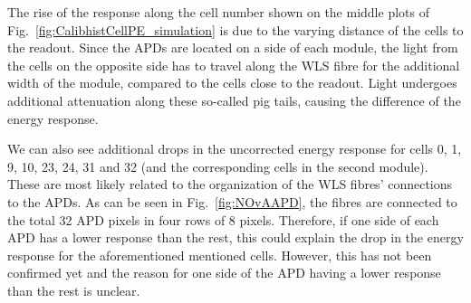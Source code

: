 The rise of the response along the cell number shown on the middle plots of Fig.~\ref{fig:CalibhistCellPE_simulation} is due to the varying distance of the cells to the readout. Since the \gls{APD}s are located on a side of each module, the light from the cells on the opposite side has to travel along the \gls{WLS} fibre for the additional width of the module, compared to the cells close to the readout. Light undergoes additional attenuation along these so-called pig tails, causing the difference of the energy response.

We can also see additional drops in the uncorrected energy response for cells 0, 1, 9, 10, 23, 24, 31 and 32 (and the corresponding cells in the second module). These are most likely related to the organization of the \gls{WLS} fibres' connections to the \gls{APD}s. As can be seen in Fig.~\ref{fig:NOvAAPD}, the fibres are connected to the total 32 \gls{APD} pixels in four rows of 8 pixels. Therefore, if one side of each \gls{APD} has a lower response than the rest, this could explain the drop in the energy response for the aforementioned mentioned cells. However, this has not been confirmed yet and the reason for one side of the \gls{APD} having a lower response than the rest is unclear. 

